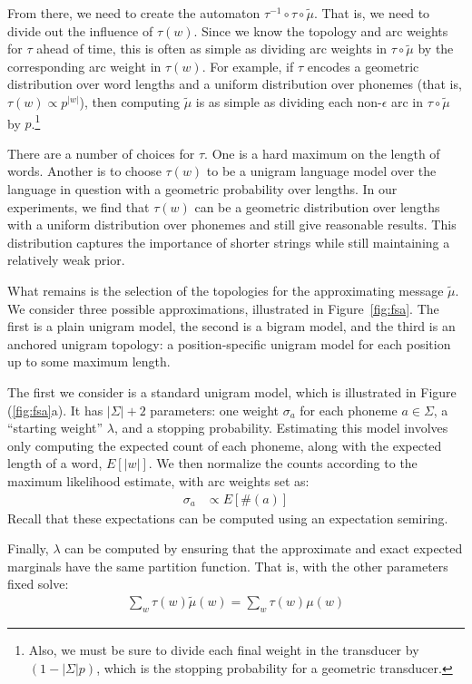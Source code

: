 \documentclass[11pt,a4paper]{article}
\begin{document}
From there, we need to create the automaton $\tau^{-1}
\circ\tau\circ\tilde\mu$. That is, we need to divide out the influence
of $\tau(w)$. Since we know the topology and arc weights for $\tau$
ahead of time, this is often as simple as dividing arc weights in
$\tau\circ\tilde\mu$ by the corresponding arc weight in $\tau(w)$.
For example, if $\tau$ encodes a geometric distribution over word
lengths and a uniform distribution over phonemes (that is, $\tau(w)
\propto {p^{|w|}}$), then computing $\tilde\mu$ is as simple as
dividing each non-$\epsilon$ arc in $\tau\circ\tilde\mu$ by $p$.\footnote{Also,
we must be sure to divide each final weight in the transducer
by $(1-|\Sigma| p)$, which is the stopping probability for a geometric
transducer.}

There are a number of choices for $\tau$. One is a hard maximum on
the length of words. Another is to choose $\tau(w)$ to be a unigram
language model over the language in question with a geometric
probability over lengths. In our experiments, we find that $\tau(w)$
can be a geometric distribution over lengths with a uniform
distribution over phonemes and still give reasonable results.
This distribution captures the importance of shorter strings while
still maintaining a relatively weak prior.

What remains is the selection of the topologies for the approximating
message $\tilde\mu$. We consider three possible approximations,
illustrated in Figure~\ref{fig:fsa}. The first is a plain unigram
model, the second is a bigram model, and the third is an anchored
unigram topology: a position-specific unigram model for each position
up to some maximum length.

The first we consider is a standard unigram model, which is illustrated
in Figure (\ref{fig:fsa}a). It has $|\Sigma|+2$ parameters: one
weight $\sigma_a$ for each phoneme $a \in \Sigma$, a ``starting
weight'' $\lambda$, and a stopping probability. Estimating this
model involves only computing the expected count of each phoneme,
along with the expected length of a word, $E[|w|]$. We then normalize
the counts according to the maximum likelihood estimate, with arc
weights set as:
\begin{equation*}
  \begin{split}
    \sigma_a &\propto E[\#(a)]
   \end{split}
 \end{equation*}
Recall that these expectations can be computed using an expectation semiring.

Finally, $\lambda$ can be computed by ensuring that the
approximate and exact expected marginals have the same partition
function. That is, with the other parameters fixed solve:
\begin{equation*}
  \begin{split}
    \sum_w \tau(w) \tilde\mu(w) = \sum_w \tau(w) \mu(w)
  \end{split}
\end{equation*}
\end{document}
